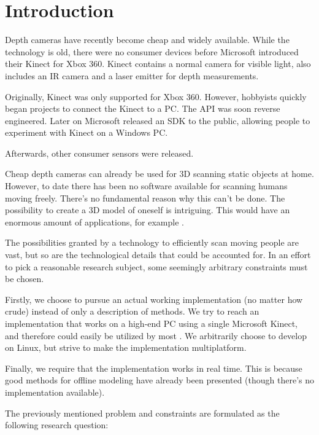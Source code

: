 \chapter{Introduction}

 Depth cameras have recently become cheap and widely available. While the technology is old, there were no consumer devices before Microsoft introduced their Kinect for Xbox 360. Kinect contains a normal camera for visible light,  also includes an IR camera and a laser emitter for depth measurements. 

Originally, Kinect was only supported for Xbox 360. However, hobbyists quickly began projects to connect the Kinect to a PC. The API was soon reverse engineered. Later on Microsoft released an SDK to the public, allowing people to experiment with Kinect on a Windows PC.

Afterwards, other consumer sensors were released. 

Cheap depth cameras can already be used for 3D scanning static objects at home. However, to date there has been no software available for scanning humans moving freely. There's no fundamental reason why this can't be done. The possibility to create a 3D model of oneself is intriguing. This would have an enormous amount of applications, for example .


The possibilities granted by a technology to efficiently scan moving people are vast, but so are the technological details that could be accounted for. In an effort to pick a reasonable research subject, some seemingly arbitrary constraints must be chosen.

Firstly, we choose to pursue an actual working implementation (no matter how crude) instead of only a description of methods. We try to reach an implementation that works on a high-end PC using a single Microsoft Kinect, and therefore could easily be utilized by most . We arbitrarily choose to develop on Linux, but strive to make the implementation multiplatform.

Finally, we require that the implementation works in real time. This is because good methods for offline modeling have already been presented (though there's no implementation available).

The previously mentioned problem and constraints are formulated as the following research question:

